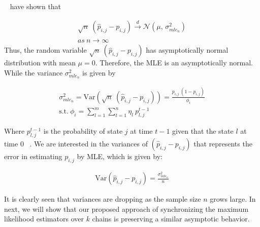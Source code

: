 	\par ~\citet{anderson1957statistical} have shown that 
	
	

	\begin{equation}
	\begin{aligned}
	\label{eq:lim_dist}
	 \sqrt{n}\ (\hat{p}_{i,j} - {p}_{i,j}) \xrightarrow{d} \mathcal{N}(\mu,\,\sigma^{2}_{mle_n})\\
	 as\ n \xrightarrow{} \infty
	 \end{aligned}
	\end{equation}
Thus, the random variable $\sqrt{n}\ (\hat{p}_{i,j} - {p}_{i,j})$ has asymptotically normal distribution with mean $\mu=0$. Therefore, the MLE is an asymptotically normal. While the variance  $\sigma^{2}_{mle_n}$ is given by   




\begin{equation}
\begin{aligned}
\sigma^{2}_{mle_n}=\mathrm{Var}(\sqrt{n}\ (\hat{p}_{i,j} - {p}_{i,j})) = \frac {{p}_{i,j}\ (1- {p}_{i,j})} {\phi_{i}} \\
\text{s.t.}\ \phi_{i} = \sum_{l=1}^{m} \sum_{t=1}^{n} \eta_{l} \ p_{l,j}^{t-1}
\end{aligned}
\end{equation}

Where $p_{l,j}^{t-1}$ is the probability of state $j$ at time  $t-1$ given that the state $l$ at time $0$  ~\cite{anderson1957statistical}. We are interested in the variances of $(\hat{p}_{i,j} - {p}_{i,j})$ that represents the error in estimating ${p}_{i,j}$ by MLE, which is given by:

	\begin{equation}
\begin{aligned}
	\mathrm{Var} (\hat{p}_{i,j} - {p}_{i,j}) = \frac {\sigma^{2}_{mle_n}}{n} 
\end{aligned}
\end{equation}

It is clearly seen that variances are dropping as the sample size $n$ grows large.  In next, we will show that our proposed approach of synchronizing the maximum likelihood estimators over $k$ chains is preserving  a similar asymptotic behavior. 


